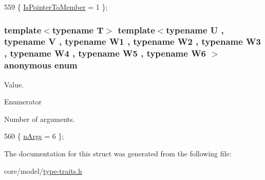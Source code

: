 \begin{DoxyCode}
559 \{ \hyperlink{structTypeTraits_1_1PtrToMemberTraits_3_01U_07V_1_1_5_08_07W1_00_01W2_00_01W3_00_01W4_00_01W5_00_01W6_08_01const_01_01_4_ae4bec95e83a2c79a3f8fe7c7f976d2edad3efdf466cebc11a1f94825e1e9bebce}{IsPointerToMember} = 1    \};
\end{DoxyCode}
\subsubsection[{\texorpdfstring{anonymous enum}{anonymous enum}}]{\setlength{\rightskip}{0pt plus 5cm}template$<$typename T$>$ template$<$typename U , typename V , typename W1 , typename W2 , typename W3 , typename W4 , typename W5 , typename W6 $>$ anonymous enum}\hypertarget{structTypeTraits_1_1PtrToMemberTraits_3_01U_07V_1_1_5_08_07W1_00_01W2_00_01W3_00_01W4_00_01W5_00_01W6_08_01const_01_01_4_a5a26c469f3fbe1e1696d4b685cf2ebd9}{}\label{structTypeTraits_1_1PtrToMemberTraits_3_01U_07V_1_1_5_08_07W1_00_01W2_00_01W3_00_01W4_00_01W5_00_01W6_08_01const_01_01_4_a5a26c469f3fbe1e1696d4b685cf2ebd9}
Value. \begin{Desc}
\item[Enumerator]\par
\begin{description}
\item[{\em 
n\+Args\hypertarget{structTypeTraits_1_1PtrToMemberTraits_3_01U_07V_1_1_5_08_07W1_00_01W2_00_01W3_00_01W4_00_01W5_00_01W6_08_01const_01_01_4_a5a26c469f3fbe1e1696d4b685cf2ebd9aec7b36c4772a13052ff8aacb9a6c0b4d}{}\label{structTypeTraits_1_1PtrToMemberTraits_3_01U_07V_1_1_5_08_07W1_00_01W2_00_01W3_00_01W4_00_01W5_00_01W6_08_01const_01_01_4_a5a26c469f3fbe1e1696d4b685cf2ebd9aec7b36c4772a13052ff8aacb9a6c0b4d}
}]Number of arguments. \end{description}
\end{Desc}

\begin{DoxyCode}
560 \{ \hyperlink{structTypeTraits_1_1PtrToMemberTraits_3_01U_07V_1_1_5_08_07W1_00_01W2_00_01W3_00_01W4_00_01W5_00_01W6_08_01const_01_01_4_a5a26c469f3fbe1e1696d4b685cf2ebd9aec7b36c4772a13052ff8aacb9a6c0b4d}{nArgs} = 6                \};
\end{DoxyCode}


The documentation for this struct was generated from the following file\+:\begin{DoxyCompactItemize}
\item 
core/model/\hyperlink{type-traits_8h}{type-\/traits.\+h}\end{DoxyCompactItemize}
